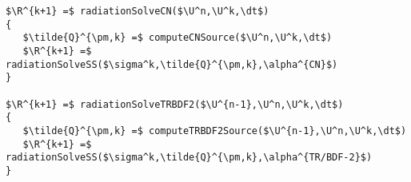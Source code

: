 \documentclass[preprint,12pt]{elsarticle}
\begin{document}
\begin{lstlisting}[mathescape,columns=fullflexible,
   basicstyle=\fontfamily{lmvtt}\selectfont]
$\R^{k+1} =$ radiationSolveCN($\U^n,\U^k,\dt$)
{
   $\tilde{Q}^{\pm,k} =$ computeCNSource($\U^n,\U^k,\dt$)
   $\R^{k+1} =$ radiationSolveSS($\sigma^k,\tilde{Q}^{\pm,k},\alpha^{CN}$)
}

$\R^{k+1} =$ radiationSolveTRBDF2($\U^{n-1},\U^n,\U^k,\dt$)
{
   $\tilde{Q}^{\pm,k} =$ computeTRBDF2Source($\U^{n-1},\U^n,\U^k,\dt$)
   $\R^{k+1} =$ radiationSolveSS($\sigma^k,\tilde{Q}^{\pm,k},\alpha^{TR/BDF-2}$)
}
\end{lstlisting}
\end{document}

